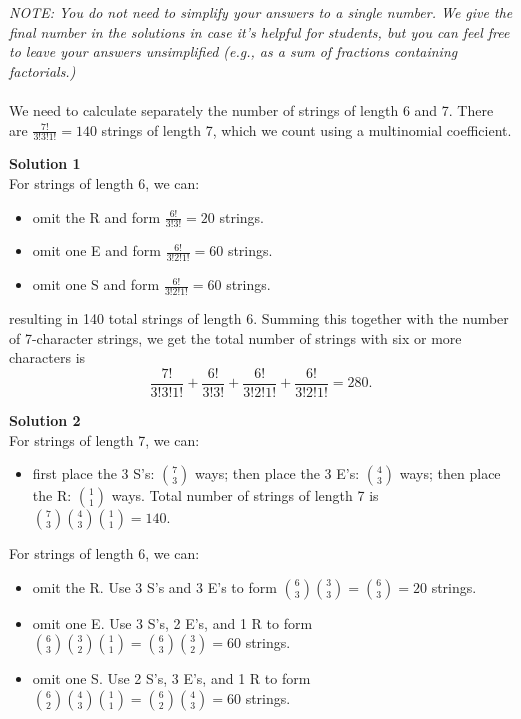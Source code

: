 \documentclass[12pt]{exam}
\begin{document}
\begin{solution}

\textit{NOTE: You do not need to simplify your answers to a single number. We give the final number in the solutions in case it's helpful for students, but you can feel free to leave your answers unsimplified (e.g., as a sum of fractions containing factorials.)}\\\\
We need to calculate separately the number of strings of length 6 and 7. There are $\frac{7!}{3!3!1!} = 140$ strings of length 7, which we count using a multinomial coefficient.

\textbf{Solution 1}\\
For strings of length 6, we can: 
\begin{itemize}
    \item omit the R and form $\frac{6!}{3!3!} = 20$ strings.  
    \item omit one E and form $\frac{6!}{3!2!1!} = 60$ strings. 
    \item omit one S and form $\frac{6!}{3!2!1!} = 60$ strings.
\end{itemize}
resulting in 140 total strings of length 6. Summing this together with the number of 7-character strings, we get the total number of strings with six or more characters is $$\frac{7!}{3!3!1!} + \frac{6!}{3!3!} + \frac{6!}{3!2!1!} + \frac{6!}{3!2!1!} = 280.$$ 

\textbf{Solution 2}\\
For strings of length 7, we can:
\begin{itemize}
    \item first place the 3 S's: $\binom73$ ways; then place the 3 E's: $\binom43$ ways; then place the R: $\binom 11$ ways. Total number of strings of length 7 is $\binom73 \binom43 \binom11 = 140$.\\
\end{itemize}
For strings of length 6, we can: 
\begin{itemize}
    \item omit the R. Use 3 S's and 3 E's to form $\binom63 \binom33 = \binom 63 = 20$ strings.  
    \item omit one E. Use 3 S's, 2 E's, and 1 R to form   $\binom63 \binom32 \binom11 = \binom 63 \binom32=  60$ strings. 
    \item omit one S. Use 2 S's, 3 E's, and 1 R to form $\binom62 \binom43 \binom11 = \binom62 \binom43 = 60$ strings.
\end{itemize}


\end{solution}
\end{document}
